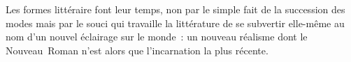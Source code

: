 \documentclass[12pt, a4paper]{article}
\begin{document}
Les formes littéraire font leur temps, non par le simple fait de la succession des modes mais par le souci qui travaille la littérature de se subvertir elle-même au nom d'un nouvel éclairage sur le monde~: un nouveau réalisme dont le Nouveau~Roman n'est alors que l'incarnation la plus récente.
\end{document}
